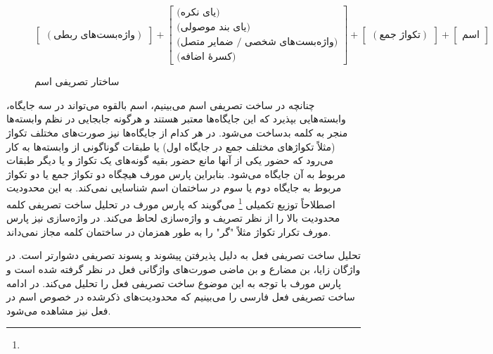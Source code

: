\documentclass[12pt,onecolumn,a4paper]{article}
\begin{document}
    \begin{figure}[hp]
        \[
            \begin{bmatrix}
                (\textrm{واژه‌بست‌های ربطی})
            \end{bmatrix}
            +
            \begin{bmatrix}
                \textrm{(یای نکره)} \\
                \textrm{(یای بند موصولی)} \\
                \textrm{(واژه‌بست‌های شخصی / ضمایر متصل)} \\
                \textrm{(کسرهٔ اضافه)}
            \end{bmatrix}
            +
            \begin{bmatrix}
                (\textrm{تکواژ جمع})
            \end{bmatrix}
            +
            \begin{bmatrix}
                \textrm{اسم}
            \end{bmatrix}
        \]
        \caption{ساختار تصریفی اسم {\mfo\citep{Eslami88}}}
    \end{figure}

    \par\noindent
    چنانچه در ساخت تصریفی اسم می‌بینیم، اسم بالقوه می‌تواند در سه جایگاه، وابسته‌هایی بپذیرد که این جایگاه‌ها معتبر هستند و هرگونه جابجایی در نظم وابسته‌ها منجر به کلمه بدساخت می‌شود. در هر کدام از جایگاه‌ها نیز صورت‌های مختلف تکواژ (مثلاً تکواژهای مختلف جمع در جایگاه اول) یا طبقات گوناگونی از وابسته‌ها به کار می‌رود که حضور یکی از آنها مانع حضور بقیه گونه‌های یک تکواژ و یا دیگر طبقات مربوط به آن جایگاه می‌شود. بنابراین پارس مورف هیچگاه دو تکواژ جمع یا دو تکواژ مربوط به جایگاه دوم یا سوم در ساختمان اسم شناسایی نمی‌کند. به این محدودیت اصطلاحاً توزیع تکمیلی \footnote{} می‌گویند که پارس مورف در تحلیل ساخت تصریفی کلمه محدودیت بالا را از نظر تصریف و واژه‌سازی لحاظ می‌کند. در واژه‌سازی نیز پارس مورف تکرار تکواژ مثلاً "گر" را به طور همزمان در ساختمان کلمه مجاز نمی‌داند.

    \par\noindent
    تحلیل ساخت تصریفی فعل به دلیل پذیرفتن پیشوند و پسوند تصریفی دشوارتر است. در واژگان زایا، بن مضارع و بن ماضی صورت‌های واژگانی فعل در نظر گرفته شده است و پارس مورف با توجه به این موضوع ساخت تصریفی فعل را تحلیل می‌کند. در ادامه ساخت تصریفی فعل فارسی را می‌بینیم که محدودیت‌های ذکرشده در خصوص اسم در فعل نیز مشاهده می‌شود.
\end{document}
